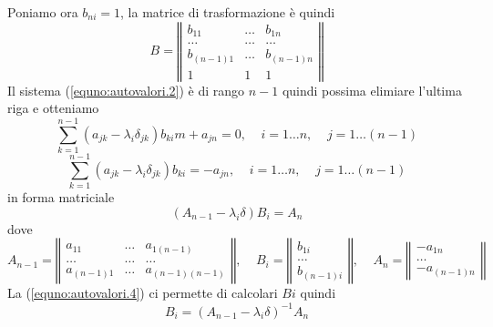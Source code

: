 Poniamo ora $b_{ni}=1$, la matrice di trasformazione \`e quindi
\begin{displaymath}
  B=
  \left\Vert
  \begin{array}{lll}
    b_{11}&\dots&b_{1n}
    \\
    \dots&\dots&\dots
    \\
    b_{(n-1)1}&\dots&b_{(n-1)n}
    \\
    1&1&1
  \end{array}
  \right\Vert
\end{displaymath}
Il sistema (\ref{equno:autovalori.2}) \`e di rango $n-1$
quindi possima elimiare l'ultima riga e otteniamo
\begin{displaymath}
  \sum_{k=1}^{n-1}\left( a_{jk} - \lambda_i \delta_{jk}\right)b_{ki}m+a_{jn}=0
  ,\;\;\;\;i=1\dots n
  ,\;\;\;\;j=1\dots (n-1)
\end{displaymath}
\begin{equation}
  \sum_{k=1}^{n-1}\left( a_{jk} - \lambda_i \delta_{jk}\right)b_{ki}=-a_{jn}
  ,\;\;\;\;i=1\dots n
  ,\;\;\;\;j=1\dots (n-1)
  \label{equno:autovalori.3}
\end{equation}
in forma matriciale
\begin{equation}
  \left( A_{n-1} - \lambda_i \delta \right) B_i=A_n
  \label{equno:autovalori.4}
\end{equation}
dove
\begin{displaymath}
  A_{n-1}=
  \left\Vert
  \begin{array}{lll}
    a_{11}&\dots&a_{1(n-1)}
    \\
    \dots&\dots&\dots
    \\
    a_{(n-1)1}&\dots&a_{(n-1)(n-1)}
  \end{array}
  \right\Vert
  ,\;\;\;\;
  B_i = 
  \left\Vert
  \begin{array}{l}
    b_{1i}
    \\
    \dots
    \\
    b_{(n-1)i}
  \end{array}
  \right\Vert
  ,\;\;\;\;
  A_n = 
  \left\Vert
  \begin{array}{l}
    -a_{1n}
    \\
    \dots
    \\
    -a_{(n-1)n}
  \end{array}
  \right\Vert
\end{displaymath}
La (\ref{equno:autovalori.4}) ci permette di calcolari $Bi$ quindi
\begin{equation}
   B_i=\left( A_{n-1} - \lambda_i \delta \right)^{-1}A_n
  \label{equno:autovalori.5}
\end{equation}

